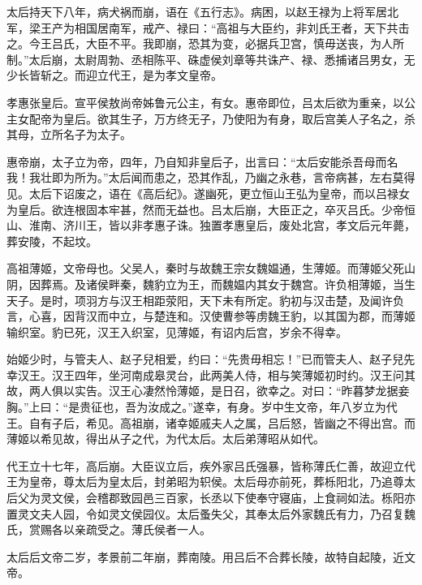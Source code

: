 \documentclass[12pt,UTF8]{ctexbook}
\begin{document}
太后持天下八年，病犬祸而崩，语在《五行志》。病困，以赵王禄为上将军居北军，梁王产为相国居南军，戒产、禄曰：“高祖与大臣约，非刘氏王者，天下共击之。今王吕氏，大臣不平。我即崩，恐其为变，必据兵卫宫，慎毋送丧，为人所制。”太后崩，太尉周勃、丞相陈平、硃虚侯刘章等共诛产、禄、悉捕诸吕男女，无少长皆斩之。而迎立代王，是为孝文皇帝。



孝惠张皇后。宣平侯敖尚帝姊鲁元公主，有女。惠帝即位，吕太后欲为重亲，以公主女配帝为皇后。欲其生子，万方终无子，乃使阳为有身，取后宫美人子名之，杀其母，立所名子为太子。



惠帝崩，太子立为帝，四年，乃自知非皇后子，出言曰：“太后安能杀吾母而名我！我壮即为所为。”太后闻而患之，恐其作乱，乃幽之永巷，言帝病甚，左右莫得见。太后下诏废之，语在《高后纪》。遂幽死，更立恒山王弘为皇帝，而以吕禄女为皇后。欲连根固本牢甚，然而无益也。吕太后崩，大臣正之，卒灭吕氏。少帝恒山、淮南、济川王，皆以非孝惠子诛。独置孝惠皇后，废处北宫，孝文后元年薨，葬安陵，不起坟。



高祖薄姬，文帝母也。父吴人，秦时与故魏王宗女魏媪通，生薄姬。而薄姬父死山阴，因葬焉。及诸侯畔秦，魏豹立为王，而魏媪内其女于魏宫。许负相薄姬，当生天子。是时，项羽方与汉王相距荥阳，天下未有所定。豹初与汉击楚，及闻许负言，心喜，因背汉而中立，与楚连和。汉使曹参等虏魏王豹，以其国为郡，而薄姬输织室。豹已死，汉王入织室，见薄姬，有诏内后宫，岁余不得幸。



始姬少时，与管夫人、赵子兒相爱，约曰：“先贵毋相忘！”已而管夫人、赵子兒先幸汉王。汉王四年，坐河南成皋灵台，此两美人侍，相与笑薄姬初时约。汉王问其故，两人俱以实告。汉王心凄然怜薄姬，是日召，欲幸之。对曰：“昨暮梦龙据妾胸。”上曰：“是贵征也，吾为汝成之。”遂幸，有身。岁中生文帝，年八岁立为代王。自有子后，希见。高祖崩，诸幸姬戚夫人之属，吕后怒，皆幽之不得出宫。而薄姬以希见故，得出从子之代，为代太后。太后弟薄昭从如代。



代王立十七年，高后崩。大臣议立后，疾外家吕氏强暴，皆称薄氏仁善，故迎立代王为皇帝，尊太后为皇太后，封弟昭为轵侯。太后母亦前死，葬栎阳北，乃追尊太后父为灵文侯，会稽郡致园邑三百家，长丞以下使奉守寝庙，上食祠如法。栎阳亦置灵文夫人园，令如灵文侯园仪。太后蚤失父，其奉太后外家魏氏有力，乃召复魏氏，赏赐各以亲疏受之。薄氏侯者一人。



太后后文帝二岁，孝景前二年崩，葬南陵。用吕后不合葬长陵，故特自起陵，近文帝。
\end{document}
